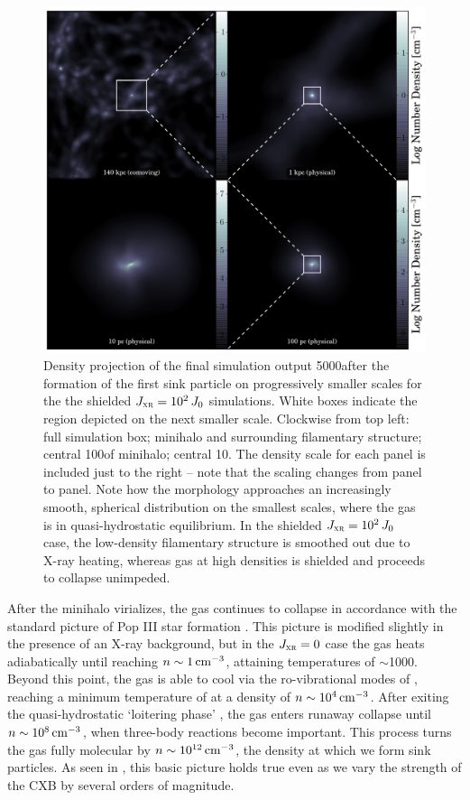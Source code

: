 \documentclass[../thesis.tex]{subfiles}
\begin{document}
\begin{figure}
  \begin{center}
    \includegraphics[width=\textwidth]{figures/structure/structure-xr_tau2_J2_t0}
    \caption{Density projection of the final simulation output 5000\yr after the formation of the first sink particle on progressively smaller scales for the the shielded $J_{\textsc{xr}}=10^2\,J_0$ simulations.  White boxes indicate the region depicted on the next smaller scale.  Clockwise from top left: full simulation box; minihalo and surrounding filamentary structure; central 100\pc of minihalo; central 10\pc.  The density scale for each panel is included just to the right -- note that the scaling changes from panel to panel. Note how the morphology approaches an increasingly smooth, spherical distribution on the smallest scales, where the gas is in quasi-hydrostatic equilibrium.  In the shielded $J_{\textsc{xr}}=10^2\,J_0$ case, the low-density filamentary structure is smoothed out due to X-ray heating, whereas gas at high densities is shielded and proceeds to collapse unimpeded.}
    \label{zoom-in2}
  \end{center}
\end{figure}

After the minihalo virializes, the gas continues to collapse in accordance with the standard picture of Pop III star formation \citep[e.g.,][]{StacyGreifBromm2010, Greifetal2012, StacyBromm2013}. This picture is modified slightly in the presence of an X-ray background, but in the $J_{\textsc{xr}}=0$ case the gas heats adiabatically until reaching $n\sim1\,\mathrm{cm}^{-3}$, attaining temperatures of $\sim$1000\kelvin. Beyond this point, the gas is able to cool via the ro-vibrational modes of \htwo, reaching a minimum temperature of \kelvin at a density of $n\sim10^4\,\mathrm{cm}^{-3}$.  After exiting the quasi-hydrostatic `loitering phase' \citep{BrommCoppiLarson2002}, the gas enters runaway collapse until $n\sim10^8\,\mathrm{cm}^{-3}$, when three-body reactions become important.  This process turns the gas fully molecular by $n\sim10^{12}\,\mathrm{cm}^{-3}$, the density at which we form sink particles. As seen in , this basic picture holds true even as we vary the strength of the CXB by several orders of magnitude. 
\end{document}
